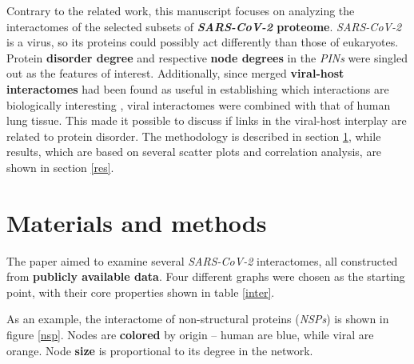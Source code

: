 \documentclass[a4paper]{article}
\begin{document}
Contrary to the related work, this manuscript focuses on analyzing the interactomes of the selected subsets of \textbf{\textit{SARS-CoV-2} proteome}. \textit{SARS-CoV-2} is a virus, so its proteins could possibly act differently than those of eukaryotes. Protein \textbf{disorder degree} and respective \textbf{node degrees} in the \textit{PINs} were singled out as the features of interest. Additionally, since merged \textbf{viral-host interactomes} had been found as useful in establishing which interactions are biologically interesting \cite{gao}, viral interactomes were combined with that of human lung tissue. This made it possible to discuss if links in the viral-host interplay are related to protein disorder. The methodology is described in section \ref{meth}, while results, which are based on several scatter plots and correlation analysis, are shown in section \ref{res}.

\section{Materials and methods}
\label{meth}

The paper aimed to examine several \textit{SARS-CoV-2} interactomes, all constructed from \textbf{publicly available data}. Four different graphs were chosen as the starting point, with their core properties shown in table \ref{inter}.

\begin{table}[h!]
  \centering
  \caption{Analyzed interactomes and their properties}
  \label{inter}
\end{table}

As an example, the interactome of non-structural proteins (\textit{NSPs}) is shown in figure \ref{nsp}. Nodes are \textbf{colored} by origin -- human are blue, while viral are orange. Node \textbf{size} is proportional to its degree in the network.
\end{document}

